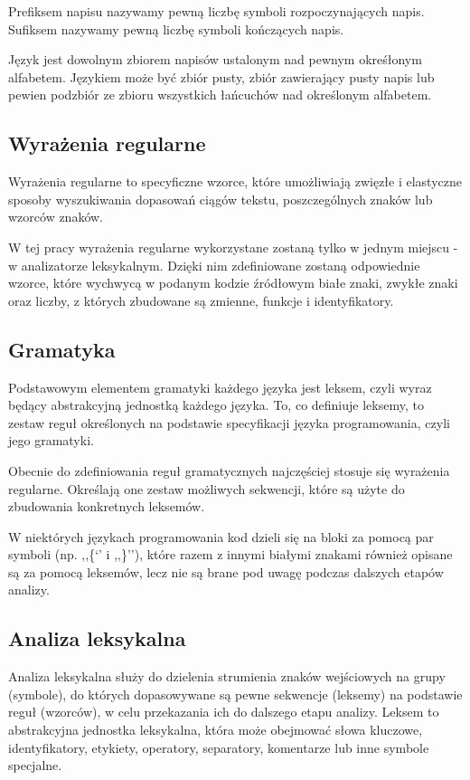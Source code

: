 \documentclass[a4paper,12pt]{article}
\begin{document}
Prefiksem napisu nazywamy pewną liczbę symboli rozpoczynających napis. Sufiksem nazywamy pewną liczbę symboli kończących napis. 

Język jest dowolnym zbiorem napisów ustalonym nad pewnym okreśłonym alfabetem. Językiem może być zbiór pusty, zbiór zawierający pusty napis lub pewien podzbiór ze zbioru wszystkich łańcuchów nad określonym alfabetem.

\subsection{Wyrażenia regularne}

Wyrażenia regularne to specyficzne wzorce, które umożliwiają zwięzłe i elastyczne sposoby wyszukiwania dopasowań ciągów tekstu, poszczególnych znaków lub wzorców znaków.

W tej pracy wyrażenia regularne wykorzystane zostaną tylko w jednym miejscu - w analizatorze leksykalnym. Dzięki nim zdefiniowane zostaną odpowiednie wzorce, które wychwycą w podanym kodzie źródłowym białe znaki, zwykłe znaki oraz liczby, z których zbudowane są zmienne, funkcje i identyfikatory.

\subsection{Gramatyka}

Podstawowym elementem gramatyki każdego języka jest leksem, czyli wyraz będący abstrakcyjną jednostką każdego języka. To, co definiuje leksemy, to zestaw reguł określonych na podstawie specyfikacji języka programowania, czyli jego gramatyki.

Obecnie do zdefiniowania reguł gramatycznych najczęściej stosuje się wyrażenia regularne. Określają one zestaw możliwych sekwencji, które są użyte do zbudowania konkretnych leksemów.

W niektórych językach programowania kod dzieli się na bloki za pomocą par symboli (np. ,,\{‘’ i ,,\}’’), które razem z innymi białymi znakami również opisane są za pomocą leksemów, lecz nie są brane pod uwagę podczas dalszych etapów analizy.

\subsection{Analiza leksykalna}

Analiza leksykalna służy do dzielenia strumienia znaków wejściowych na grupy (symbole), do których dopasowywane są pewne sekwencje (leksemy) na podstawie reguł (wzorców), w celu przekazania ich do dalszego etapu analizy. Leksem to abstrakcyjna jednostka leksykalna, która może obejmować słowa kluczowe, identyfikatory, etykiety, operatory, separatory, komentarze lub inne symbole specjalne.
\end{document}
